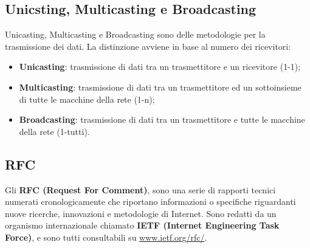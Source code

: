     \subsection{Unicsting, Multicasting e Broadcasting}
        Unicasting, Multicasting e Broadcasting sono delle metodologie per la trasmissione dei dati.
        La distinzione avviene in base al numero dei ricevitori:

        \begin{itemize}
            \item \textbf{Unicasting}: trasmissione di dati tra un trasmettitore e un ricevitore (1-1);
            \item \textbf{Multicasting}: trasmissione di dati tra un trasmettitore ed un sottoinsieme di tutte le macchine della rete (1-n);
            \item \textbf{Broadcasting}: trasmissione di dati tra un trasmettitore e tutte le macchine della rete (1-tutti).
        \end{itemize}

    \subsection{RFC}
        Gli \textbf{RFC (Request For Comment)}, sono una serie di rapporti tecnici numerati
        cronologicamente che riportano informazioni o specifiche riguardanti nuove ricerche,
        innovazioni e metodologie di Internet. Sono redatti da un organismo internazionale chiamato
        \textbf{IETF (Internet Engineering Task Force)}, e sono tutti consultabili su \url{www.ietf.org/rfc/}.
